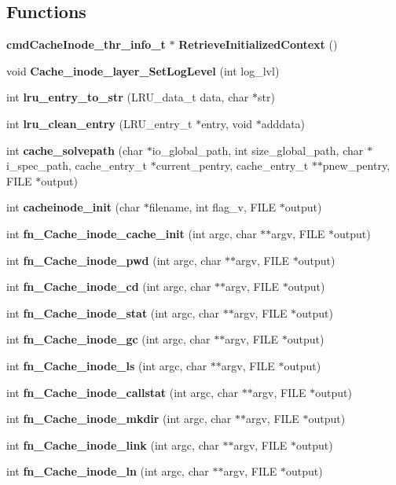 \subsection*{Functions}
\begin{DoxyCompactItemize}
\item 
{\bf cmdCacheInode\_\-thr\_\-info\_\-t} $\ast$ {\bf RetrieveInitializedContext} ()
\item 
void {\bf Cache\_\-inode\_\-layer\_\-SetLogLevel} (int log\_\-lvl)
\item 
int {\bf lru\_\-entry\_\-to\_\-str} (LRU\_\-data\_\-t data, char $\ast$str)
\item 
int {\bf lru\_\-clean\_\-entry} (LRU\_\-entry\_\-t $\ast$entry, void $\ast$adddata)
\item 
int {\bf cache\_\-solvepath} (char $\ast$io\_\-global\_\-path, int size\_\-global\_\-path, char $\ast$i\_\-spec\_\-path, cache\_\-entry\_\-t $\ast$current\_\-pentry, cache\_\-entry\_\-t $\ast$$\ast$pnew\_\-pentry, FILE $\ast$output)
\item 
int {\bf cacheinode\_\-init} (char $\ast$filename, int flag\_\-v, FILE $\ast$output)
\item 
int {\bf fn\_\-Cache\_\-inode\_\-cache\_\-init} (int argc, char $\ast$$\ast$argv, FILE $\ast$output)
\item 
int {\bf fn\_\-Cache\_\-inode\_\-pwd} (int argc, char $\ast$$\ast$argv, FILE $\ast$output)
\item 
int {\bf fn\_\-Cache\_\-inode\_\-cd} (int argc, char $\ast$$\ast$argv, FILE $\ast$output)
\item 
int {\bf fn\_\-Cache\_\-inode\_\-stat} (int argc, char $\ast$$\ast$argv, FILE $\ast$output)
\item 
int {\bf fn\_\-Cache\_\-inode\_\-gc} (int argc, char $\ast$$\ast$argv, FILE $\ast$output)
\item 
int {\bf fn\_\-Cache\_\-inode\_\-ls} (int argc, char $\ast$$\ast$argv, FILE $\ast$output)
\item 
int {\bf fn\_\-Cache\_\-inode\_\-callstat} (int argc, char $\ast$$\ast$argv, FILE $\ast$output)
\item 
int {\bf fn\_\-Cache\_\-inode\_\-mkdir} (int argc, char $\ast$$\ast$argv, FILE $\ast$output)
\item 
int {\bf fn\_\-Cache\_\-inode\_\-link} (int argc, char $\ast$$\ast$argv, FILE $\ast$output)
\item 
int {\bf fn\_\-Cache\_\-inode\_\-ln} (int argc, char $\ast$$\ast$argv, FILE $\ast$output)
\item 
$$
\end{DoxyCompactItemize}
